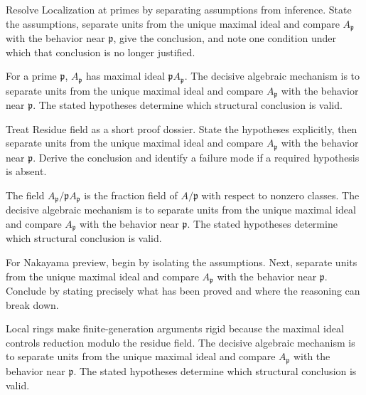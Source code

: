 \begin{problem}\label{prob:v08-problem-04}
Resolve Localization at primes by separating assumptions from inference. State the assumptions, separate units from the unique maximal ideal and compare \(A_{\mathfrak p}\) with the behavior near \(\mathfrak p\), give the conclusion, and note one condition under which that conclusion is no longer justified.
\end{problem}
\begin{solution}
For a prime $\mathfrak p$, $A_{\mathfrak p}$ has maximal ideal $\mathfrak p A_{\mathfrak p}$. The decisive algebraic mechanism is to separate units from the unique maximal ideal and compare \(A_{\mathfrak p}\) with the behavior near \(\mathfrak p\). The stated hypotheses determine which structural conclusion is valid.
\end{solution}

\begin{problem}\label{prob:v08-problem-05}
Treat Residue field as a short proof dossier. State the hypotheses explicitly, then separate units from the unique maximal ideal and compare \(A_{\mathfrak p}\) with the behavior near \(\mathfrak p\). Derive the conclusion and identify a failure mode if a required hypothesis is absent.
\end{problem}
\begin{solution}
The field $A_{\mathfrak p}/\mathfrak p A_{\mathfrak p}$ is the fraction field of $A/\mathfrak p$ with respect to nonzero classes. The decisive algebraic mechanism is to separate units from the unique maximal ideal and compare \(A_{\mathfrak p}\) with the behavior near \(\mathfrak p\). The stated hypotheses determine which structural conclusion is valid.
\end{solution}

\begin{problem}\label{prob:v08-problem-06}
For Nakayama preview, begin by isolating the assumptions. Next, separate units from the unique maximal ideal and compare \(A_{\mathfrak p}\) with the behavior near \(\mathfrak p\). Conclude by stating precisely what has been proved and where the reasoning can break down.
\end{problem}
\begin{solution}
Local rings make finite-generation arguments rigid because the maximal ideal controls reduction modulo the residue field. The decisive algebraic mechanism is to separate units from the unique maximal ideal and compare \(A_{\mathfrak p}\) with the behavior near \(\mathfrak p\). The stated hypotheses determine which structural conclusion is valid.
\end{solution}


